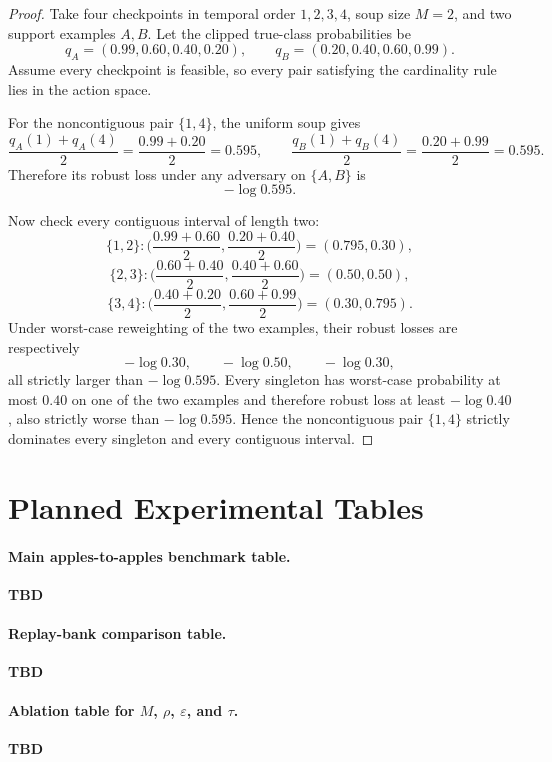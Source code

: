 \documentclass{article}
\newcommand{\TBD}{\textbf{TBD}}
\newcommand{\eps}{\varepsilon}
\begin{document}
\begin{proof}
Take four checkpoints in temporal order \(1,2,3,4\), soup size \(M=2\), and two support examples \(A,B\). Let the clipped true-class probabilities be
\[
    q_A = (0.99, 0.60, 0.40, 0.20),
    \qquad
    q_B = (0.20, 0.40, 0.60, 0.99).
\]
Assume every checkpoint is feasible, so every pair satisfying the cardinality rule lies in the action space.

For the noncontiguous pair \(\{1,4\}\), the uniform soup gives
\[
    \frac{q_A(1)+q_A(4)}{2}
    =
    \frac{0.99+0.20}{2}
    = 0.595,
    \qquad
    \frac{q_B(1)+q_B(4)}{2}
    =
    \frac{0.20+0.99}{2}
    = 0.595.
\]
Therefore its robust loss under any adversary on \(\{A,B\}\) is
\[
    -\log 0.595.
\]

Now check every contiguous interval of length two:
\[
    \{1,2\}:
    \Big(
        \frac{0.99+0.60}{2},
        \frac{0.20+0.40}{2}
    \Big)
    =
    (0.795,0.30),
\]
\[
    \{2,3\}:
    \Big(
        \frac{0.60+0.40}{2},
        \frac{0.40+0.60}{2}
    \Big)
    =
    (0.50,0.50),
\]
\[
    \{3,4\}:
    \Big(
        \frac{0.40+0.20}{2},
        \frac{0.60+0.99}{2}
    \Big)
    =
    (0.30,0.795).
\]
Under worst-case reweighting of the two examples, their robust losses are respectively
\[
    -\log 0.30,\qquad -\log 0.50,\qquad -\log 0.30,
\]
all strictly larger than \(-\log 0.595\). Every singleton has worst-case probability at most \(0.40\) on one of the two examples and therefore robust loss at least \(-\log 0.40\), also strictly worse than \(-\log 0.595\). Hence the noncontiguous pair \(\{1,4\}\) strictly dominates every singleton and every contiguous interval.
\end{proof}

\section{Planned Experimental Tables}

\paragraph{Main apples-to-apples benchmark table.}
\TBD{}

\paragraph{Replay-bank comparison table.}
\TBD{}

\paragraph{Ablation table for \(M\), \(\rho\), \(\eps\), and \(\tau\).}
\TBD{}
\end{document}
